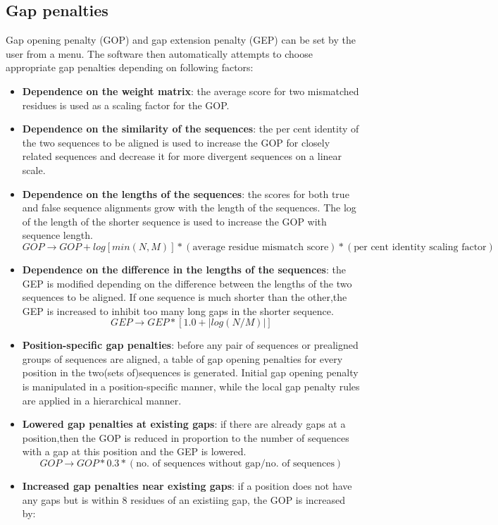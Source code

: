 \subsection{Gap penalties}
Gap opening penalty (GOP) and gap extension penalty (GEP) can be set by the user from a menu.
The software then automatically attempts to choose appropriate gap penalties depending on following factors:
\begin{itemize}
\item \textbf{Dependence on the weight matrix}: the average score for two mismatched residues is used as a scaling factor for the GOP.
\item \textbf{Dependence on the similarity of the sequences}: the per cent identity of the two sequences to be aligned is used to increase the GOP for closely related sequences and decrease it for more divergent sequences on a linear scale.
\item \textbf{Dependence on the lengths of the sequences}: the scores for both true and false sequence alignments grow  with the length of the sequences. The log of the length of the shorter sequence is used to increase the GOP with sequence length.
$$GOP \rightarrow {GOP+log[min(N,M)]}* (\text{average residue mismatch score}) * (\text{per cent identity scaling factor})$$
\item \textbf{Dependence on the difference in the lengths of the sequences}: the GEP is modified depending on the difference between the lengths of the two sequences to be aligned. If one sequence is much shorter than the other,the GEP is increased to inhibit too many long gaps in the shorter sequence.
$$GEP \rightarrow GEP * [1.0 + |log(N/M)|]$$
\item \textbf{Position-specific gap penalties}: before any pair of sequences or prealigned groups of sequences are aligned,  a table of gap opening penalties for every position in the two(sets  of)sequences is generated. Initial gap opening penalty is manipulated in a position-specific manner, while the local gap penalty rules are applied in a hierarchical manner.
\item \textbf{Lowered gap penalties at existing gaps}: if there are already gaps at a position,then the GOP is reduced in proportion to the number of sequences with a gap at this position and the GEP is lowered.
$$GOP  \rightarrow GOP*0.3*(\text{no. of sequences without  gap}/\text{no. of sequences})$$
\item \textbf{Increased gap penalties near existing gaps}: if a position does not have any gaps but is within 8 residues of an existiing gap, the GOP is increased by:

\end{itemize}
